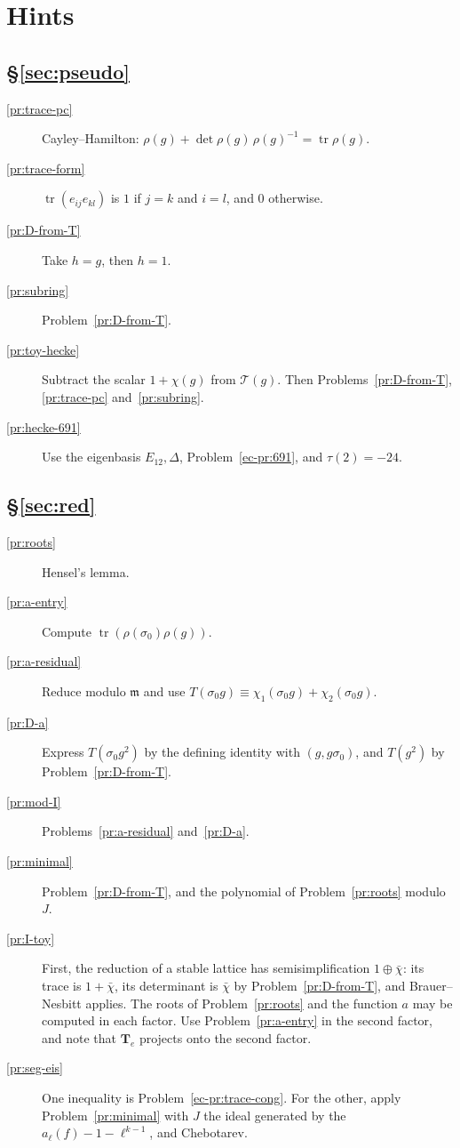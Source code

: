 \documentclass[reqno]{amsart}
\theoremstyle{definition}
\theoremstyle{plain}
\newcommand{\Tb}{\mathbf{T}}
\newcommand{\tr}{\operatorname{tr}}
\begin{document}
\section*{Hints}

\subsection*{\S\ref{sec:pseudo}}
\begin{description}
\item[\ref{pr:trace-pc}] Cayley--Hamilton: \(\rho(g) + \det\rho(g)\,\rho(g)^{-1} = \tr\rho(g)\).
\item[\ref{pr:trace-form}] \(\tr(e_{ij}e_{kl})\) is \(1\) if \(j = k\) and \(i = l\), and \(0\) otherwise.
\item[\ref{pr:D-from-T}] Take \(h = g\), then \(h = 1\).
\item[\ref{pr:subring}] Problem~\ref{pr:D-from-T}.
\item[\ref{pr:toy-hecke}] Subtract the scalar \(1 + \chi(g)\) from \(\mathcal{T}(g)\).  Then Problems~\ref{pr:D-from-T}, \ref{pr:trace-pc} and~\ref{pr:subring}.
\item[\ref{pr:hecke-691}] Use the eigenbasis \(E_{12}, \Delta\), Problem~\ref{ec-pr:691}, and \(\tau(2) = -24\).
\end{description}

\subsection*{\S\ref{sec:red}}
\begin{description}
\item[\ref{pr:roots}] Hensel's lemma.
\item[\ref{pr:a-entry}] Compute \(\tr(\rho(\sigma_0)\rho(g))\).
\item[\ref{pr:a-residual}] Reduce modulo \(\mathfrak m\) and use \(T(\sigma_0 g) \equiv \chi_1(\sigma_0 g) + \chi_2(\sigma_0 g)\).
\item[\ref{pr:D-a}] Express \(T(\sigma_0 g^2)\) by the defining identity with \((g, g\sigma_0)\), and \(T(g^2)\) by Problem~\ref{pr:D-from-T}.
\item[\ref{pr:mod-I}] Problems~\ref{pr:a-residual} and~\ref{pr:D-a}.
\item[\ref{pr:minimal}] Problem~\ref{pr:D-from-T}, and the polynomial of Problem~\ref{pr:roots} modulo \(J\).
\item[\ref{pr:I-toy}] First, the reduction of a stable lattice has semisimplification \(1 \oplus \bar\chi\): its trace is \(1 + \bar\chi\), its determinant is \(\bar\chi\) by Problem~\ref{pr:D-from-T}, and Brauer--Nesbitt applies.  The roots of Problem~\ref{pr:roots} and the function \(a\) may be computed in each factor.  Use Problem~\ref{pr:a-entry} in the second factor, and note that \(\Tb_e\) projects onto the second factor.
\item[\ref{pr:seg-eis}] One inequality is Problem~\ref{ec-pr:trace-cong}.  For the other, apply Problem~\ref{pr:minimal} with \(J\) the ideal generated by the \(a_\ell(f) - 1 - \ell^{k-1}\), and Chebotarev.
\end{description}
\end{document}

